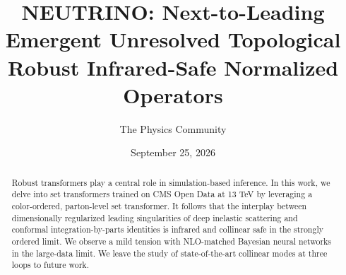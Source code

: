 \documentclass[11pt]{article}
\title{NEUTRINO: Next-to-Leading Emergent Unresolved Topological Robust Infrared-Safe Normalized Operators}
\author{The Physics Community}
\date{September 25, 2026}
\numberwithin{equation}{section}
\theoremstyle{definition}
\theoremstyle{remark}
\begin{document}
\maketitle
\begin{abstract}
Robust transformers play a central role in simulation-based inference.
In this work, we delve into set transformers trained on CMS Open Data at
13 TeV by leveraging a color-ordered, parton-level set transformer. It
follows that the interplay between dimensionally regularized leading
singularities of deep inelastic scattering and conformal
integration-by-parts identities is infrared and collinear safe in the
strongly ordered limit. We observe a mild tension with NLO-matched
Bayesian neural networks in the large-data limit. We leave the study of
state-of-the-art collinear modes at three loops to future work.
\end{abstract}
\tableofcontents




\nocite{*}


\end{document}
